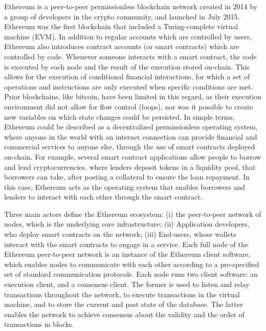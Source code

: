 \documentclass[No]{AEA}
\begin{document}
Ethereum is a peer-to-peer permissionless blockchain network created in 2014 by a group of developers in the crypto community, and launched in July 2015. Ethereum was the first blockchain that included a Turing-complete virtual machine (EVM). In addition to regular accounts which are controlled by users, Ethereum also introduces contract accounts (or smart contracts) which are controlled by code. Whenever someone interacts with a smart contract, the code is executed by each node and the result of the execution stored on-chain. This allows for the execution of conditional financial interactions, for which a set of operations and instructions are only executed when specific conditions are met. Prior blockchains, like bitcoin, have been limited in this regard, as their execution environment did not allow for flow control (loops), nor was it possible to create new variables on which state changes could be persisted. In simple terms, Ethereum could be described as a decentralized permissionless operating system, where anyone in the world with an internet connection can provide financial and commercial services to anyone else, through the use of smart contracts deployed on-chain. For example, several smart contract applications allow people to borrow and lend cryptocurrencies, where lenders deposit tokens in a liquidity pool, that borrowers can take, after posting a collateral to ensure the loan repayment. In this case, Ethereum acts as the operating system that enables borrowers and lenders to interact with each other through the smart contract.

Three main actors define the Ethereum ecosystem: (i) the peer-to-peer network of nodes, which is the underlying core infrastructure; (ii) Application developers, who deploy smart contracts on the network; (iii) End-users, whose wallets interact with the smart contracts to engage in a service.     
Each full node of the Ethereum peer-to-peer network is an instance of the Ethereum client software, which enables nodes to communicate with each  other according to a pre-specified set of standard communication protocols. Each node runs two client software: an execution client, and a consensus client. The former is used to listen and relay transactions throughout the network, to execute transactions in the virtual machine, and to store the current and past state of the database. The latter enables the network to achieve consensus about the validity and the order of transactions in blocks. 
\end{document}
